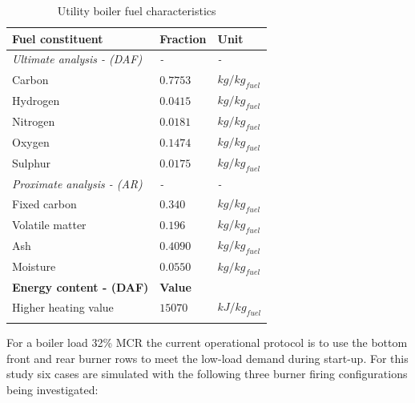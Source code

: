 \documentclass[twocolumn,10pt]{asme2ej}
\begin{document}
\begin{table}[h!]
\centering
\caption{Utility boiler fuel characteristics}
\vspace{2mm}
\label{tbl_fuel}
\begin{tabularx}{3.25in}{p{1.5in} p{0.8in} l}
\hline
\textbf{Fuel constituent} & \textbf{Fraction} & \textbf{Unit}\\
\hline
\textit{Ultimate analysis - (DAF)} & \textit{-} & \textit{-}\\
Carbon & $0.7753$ & $kg/kg_{fuel}$\\
Hydrogen & $0.0415$ & $kg/kg_{fuel}$\\
Nitrogen & $0.0181$ & $kg/kg_{fuel}$\\
Oxygen & $0.1474$ & $kg/kg_{fuel}$\\
Sulphur & $0.0175$ & $kg/kg_{fuel}$\\
\textit{Proximate analysis - (AR)} & \textit{-} & \textit{-}\\
Fixed carbon & $0.340$ & $kg/kg_{fuel}$\\
Volatile matter & $0.196$ & $kg/kg_{fuel}$\\
Ash & $0.4090$ & $kg/kg_{fuel}$\\
Moisture & $0.0550$ & $kg/kg_{fuel}$\\
\hline
\textbf{Energy content - (DAF)} & \textbf{Value} &\\
\hline
Higher heating value & $15070$ & $kJ/kg_{fuel}$\\
\hline
\vspace{0pt}
\end{tabularx}
\vspace{-10mm}
\end{table}

For a boiler load 32\% MCR the current operational protocol is to use the bottom front and rear burner rows to meet the low-load demand during start-up.  For this study six cases are simulated with the following three burner firing configurations being investigated:
\end{document}
